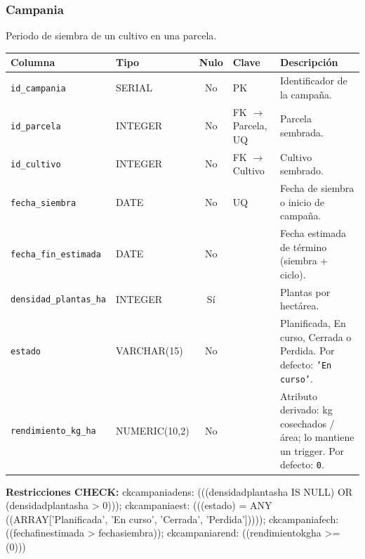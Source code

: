 \documentclass[11pt,letterpaper]{article}
\newcommand{\tbus}{\textunderscore\allowbreak}
\newcommand{\tb}[1]{{\ttfamily\let\_\tbus #1}}
\begin{document}
\subsubsection*{Campania}
Periodo de siembra de un cultivo en una parcela.
{\footnotesize
\begin{longtable}{>{\raggedright\arraybackslash}p{3.3cm}>{\raggedright\arraybackslash}p{2.5cm}c>{\raggedright\arraybackslash}p{2.2cm}>{\raggedright\arraybackslash}p{6.1cm}}
\toprule
\textbf{Columna} & \textbf{Tipo} & \textbf{Nulo} & \textbf{Clave} & \textbf{Descripción} \\
\midrule
\endhead
\texttt{id\_campania} & SERIAL & No & PK & Identificador de la campaña. \\
\texttt{id\_parcela} & INTEGER & No & FK $\to$ Parcela, UQ & Parcela sembrada. \\
\texttt{id\_cultivo} & INTEGER & No & FK $\to$ Cultivo & Cultivo sembrado. \\
\texttt{fecha\_siembra} & DATE & No & UQ & Fecha de siembra o inicio de campaña. \\
\texttt{fecha\_fin\_estimada} & DATE & No &  & Fecha estimada de término (siembra + ciclo). \\
\texttt{densidad\_plantas\_ha} & INTEGER & Sí &  & Plantas por hectárea. \\
\texttt{estado} & VARCHAR(15) & No &  & Planificada, En curso, Cerrada o Perdida. Por defecto: \texttt{'En curso'}. \\
\texttt{rendimiento\_kg\_ha} & NUMERIC(10,2) & No &  & Atributo derivado: kg cosechados / área; lo mantiene un trigger. Por defecto: \texttt{0}. \\
\bottomrule
\end{longtable}}
{\footnotesize\raggedright\textbf{Restricciones CHECK:} \tb{ck\_campania\_dens}: \tb{(((densidad\_plantas\_ha IS NULL) OR (densidad\_plantas\_ha > 0)))}; \tb{ck\_campania\_est}: \tb{(((estado) = ANY ((ARRAY['Planificada', 'En curso', 'Cerrada', 'Perdida']))))}; \tb{ck\_campania\_fech}: \tb{((fecha\_fin\_estimada > fecha\_siembra))}; \tb{ck\_campania\_rend}: \tb{((rendimiento\_kg\_ha >= (0)))}\par}
\medskip
\end{document}
